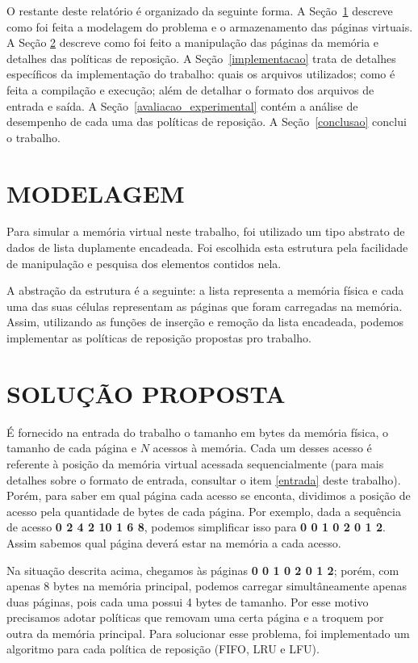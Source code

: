 \documentclass[12pt]{article}
\begin{document}
	O restante deste relatório é organizado da seguinte forma. A Seção~\ref{modelagem} descreve como foi feita a modelagem do problema e o armazenamento das páginas virtuais. A Seção \ref{solucao_proposta} descreve como foi feito a manipulação das páginas da memória e detalhes das políticas de reposição. A Seção~\ref{implementacao} trata de detalhes específicos da implementação do trabalho: quais os arquivos utilizados; como é feita a compilação e execução; além de detalhar o formato dos arquivos de entrada e saída. A Seção~\ref{avaliacao_experimental} contém a análise de desempenho de cada uma das políticas de reposição. A Seção~\ref{conclusao} conclui o trabalho.


\section{MODELAGEM}
\label{modelagem}

Para simular a memória virtual neste trabalho, foi utilizado um tipo abstrato de dados de lista duplamente encadeada. Foi escolhida esta estrutura pela facilidade de manipulação e pesquisa dos elementos contidos nela.

A abstração da estrutura é a seguinte: a lista representa a memória física e cada uma das suas células representam as páginas que foram carregadas na memória. Assim, utilizando as funções de inserção e remoção da lista encadeada, podemos implementar as políticas de reposição propostas pro trabalho.

\section{SOLUÇÃO PROPOSTA}
\label{solucao_proposta}

É fornecido na entrada do trabalho o tamanho em bytes da memória física, o tamanho de cada página e $N$ acessos à memória. Cada um desses acesso é referente à posição da memória virtual acessada sequencialmente (para mais detalhes sobre o formato de entrada, consultar o item \ref{entrada} deste trabalho). Porém, para saber em qual página cada acesso se enconta, dividimos a posição de acesso pela quantidade de bytes de cada página. Por exemplo, dada a sequência de acesso \textbf{0 2 4 2 10 1 6 8}, podemos simplificar isso para \textbf{0 0 1 0 2 0 1 2}. Assim sabemos qual página deverá estar na memória a cada acesso.

Na situação descrita acima, chegamos às páginas \textbf{0 0 1 0 2 0 1 2}; porém, com apenas 8 bytes na memória principal, podemos carregar simultâneamente apenas duas páginas, pois cada uma possui 4 bytes de tamanho. Por esse motivo precisamos adotar políticas que removam uma certa página e a troquem por outra da memória principal. Para solucionar esse problema, foi implementado um algoritmo para cada política de reposição (FIFO, LRU e LFU).
\end{document}
